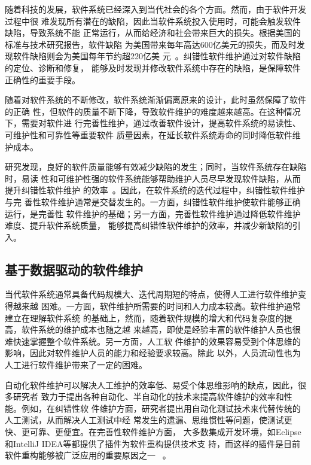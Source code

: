 随着科技的发展，软件系统已经深入到当代社会的各个方面。然而，由于软件开发过程中很
难发现所有潜在的缺陷，因此当软件系统投入使用时，可能会触发软件缺陷，导致系统不能
正常运行，从而给经济和社会带来巨大的损失。根据美国的标准与技术研究报告，软件缺陷
为美国带来每年高达600亿美元的损失，而及时发现软件缺陷则会为美国每年节约超220亿美
元~\cite{strate2013literature}。纠错性软件维护通过对软件缺陷的定位、诊断和修复，
能够及时发现并修改软件系统中存在的缺陷，是保障软件正确性的重要手段。

随着对软件系统的不断修改，软件系统渐渐偏离原来的设计，此时虽然保障了软件的正确
性，但软件的质量不断下降，导致软件维护的难度越来越高。在这种情况下，需要对软件进
行完善性维护，通过改善软件设计，提高软件系统的易读性、可维护性和可靠性等重要软件
质量因素，在延长软件系统寿命的同时降低软件维护成本。

研究发现，良好的软件质量能够有效减少缺陷的发生；同时，当软件系统存在缺陷时，易读
性和可维护性强的软件系统能够帮助维护人员尽早发现软件缺陷，从而提升纠错性软件维护
的效率~\cite{martin2009clean}。因此，在软件系统的迭代过程中，纠错性软件维护与完
善性软件维护通常是交替发生的。一方面，纠错性软件维护使软件能够正确运行，是完善性
软件维护的基础；另一方面，完善性软件维护通过降低软件维护难度、提升软件系统质量，
能够提高纠错性软件维护的效率，并减少新缺陷的引入。


\subsection{基于数据驱动的软件维护}
当代软件系统通常具备代码规模大、迭代周期短的特点，使得人工进行软件维护变得越来越
困难。一方面，软件维护所需要的时间和人力成本较高。软件维护通常建立在理解软件系统
的基础上，然而，随着软件规模的增大和代码复杂度的提高，软件系统的维护成本也随之越
来越高，即使是经验丰富的软件维护人员也很难快速掌握整个软件系统。另一方面，人工软
件维护的效果容易受到个体思维的影响，因此对软件维护人员的能力和经验要求较高。除此
以外，人员流动性也为人工进行软件维护带来了一定的困难。

自动化软件维护可以解决人工维护的效率低、易受个体思维影响的缺点，因此，很多研究者
致力于提出各种自动化、半自动化的技术来提高软件维护的效率和性能。例如，在纠错性软
件维护方面，研究者提出用自动化测试技术来代替传统的人工测试，从而解决人工测试中经
常发生的遗漏、思维惯性等问题，使测试更快、更可靠、更便宜。在完善性软件维护方面，
大多数集成开发环境，如Eclipse和IntelliJ IDEA等都提供了插件为软件重构提供技术支
持，而这样的插件是目前软件重构能够被广泛应用的重要原因之一
~\cite{griswold1993automated,tip2003refactoring,mens2005formalizing}。

